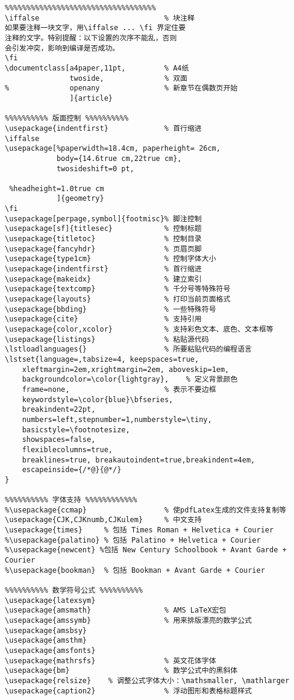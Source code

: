 \begin{verbatim}
%%%%%%%%%%%%%%%%%%%%%%%%%%%%%%%%%%%
\iffalse                             % 块注释
如果要注释一块文字，用\iffalse ... \fi 界定住要
注释的文字。特别提醒：以下设置的次序不能乱，否则
会引发冲突，影响到编译是否成功。
\fi
\documentclass[a4paper,11pt,         % A4纸
               twoside,              % 双面
%              openany               % 新章节在偶数页开始
               ]{article}

%%%%%%%%%% 版面控制 %%%%%%%%%%
\usepackage{indentfirst}             % 首行缩进
\iffalse
\usepackage[%paperwidth=18.4cm, paperheight= 26cm,
            body={14.6true cm,22true cm},
            twosideshift=0 pt,

 %headheight=1.0true cm
            ]{geometry}
\fi
\usepackage[perpage,symbol]{footmisc}% 脚注控制
\usepackage[sf]{titlesec}            % 控制标题
\usepackage{titletoc}                % 控制目录
\usepackage{fancyhdr}                % 页眉页脚
\usepackage{type1cm}                 % 控制字体大小
\usepackage{indentfirst}             % 首行缩进
\usepackage{makeidx}                 % 建立索引
\usepackage{textcomp}                % 千分号等特殊符号
\usepackage{layouts}                 % 打印当前页面格式
\usepackage{bbding}                  % 一些特殊符号
\usepackage{cite}                    % 支持引用
\usepackage{color,xcolor}            % 支持彩色文本、底色、文本框等
\usepackage{listings}                % 粘贴源代码
\lstloadlanguages{}                  % 所要粘贴代码的编程语言
\lstset{language=,tabsize=4, keepspaces=true,
    xleftmargin=2em,xrightmargin=2em, aboveskip=1em,
    backgroundcolor=\color{lightgray},    % 定义背景颜色
    frame=none,                      % 表示不要边框
    keywordstyle=\color{blue}\bfseries,
    breakindent=22pt,
    numbers=left,stepnumber=1,numberstyle=\tiny,
    basicstyle=\footnotesize,
    showspaces=false,
    flexiblecolumns=true,
    breaklines=true, breakautoindent=true,breakindent=4em,
    escapeinside={/*@}{@*/}
}

%%%%%%%%%% 字体支持 %%%%%%%%%%%%
%\usepackage{ccmap}                  % 使pdfLatex生成的文件支持复制等
\usepackage{CJK,CJKnumb,CJKulem}     % 中文支持
\usepackage{times}     % 包括 Times Roman + Helvetica + Courier
%\usepackage{palatino} % 包括 Palatino + Helvetica + Courier
%\usepackage{newcent} %包括 New Century Schoolbook + Avant Garde + Courier
%\usepackage{bookman}  % 包括 Bookman + Avant Garde + Courier

%%%%%%%%%% 数学符号公式 %%%%%%%%%%
\usepackage{latexsym}
\usepackage{amsmath}                 % AMS LaTeX宏包
\usepackage{amssymb}                 % 用来排版漂亮的数学公式
\usepackage{amsbsy}
\usepackage{amsthm}
\usepackage{amsfonts}
\usepackage{mathrsfs}                % 英文花体字体
\usepackage{bm}                      % 数学公式中的黑斜体
\usepackage{relsize}    % 调整公式字体大小：\mathsmaller, \mathlarger
\usepackage{caption2}                % 浮动图形和表格标题样式


\end{verbatim}
